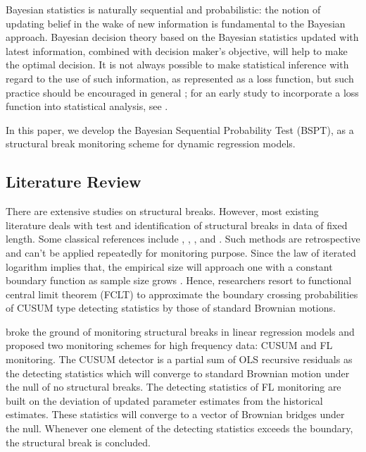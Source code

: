 \documentclass[preprint,authoryear,12pt,english]{elsarticle}
\theoremstyle{plain}
\begin{document}
Bayesian statistics is naturally sequential and probabilistic: the notion of updating belief in the wake of new information is fundamental to the Bayesian approach\citep{west1986bayesian}. Bayesian decision theory based on the Bayesian statistics updated with latest information, combined with decision maker's objective, will help to make the optimal decision. It is not always possible to make statistical inference with regard to the use of such information, as represented as a loss function, but such practice should be encouraged in general \citep[p.~1-2]{Berger1985StatisticalAnalysis}; for an early study to incorporate a loss function into statistical analysis, see \cite{Wald1949StatisticalFunctions}.

In this paper, we develop the Bayesian Sequential Probability Test (BSPT), as a structural break monitoring scheme for dynamic regression models.
\subsection{Literature Review}
There are extensive studies on structural breaks. However, most existing literature deals with test and identification of structural breaks in data of fixed length. Some classical references include \cite{Andrews1993}, \cite{Andrews1994OptimalAlternative}, \cite{Kuan1995TheView}, \cite{Bai1998a} and  \cite{Bai1994LEASTPROCESSES,Bai1995LeastShift,Bai1996TestingApproach, Bai1997EstimationModels}. Such methods are retrospective and can't be applied repeatedly for monitoring purpose. Since the law of iterated logarithm implies that, the empirical size will approach one with a constant boundary function as sample size grows \citep{Robbins1970StatisticalLogarithm}. Hence, researchers resort to functional central limit theorem (FCLT) to approximate the boundary crossing probabilities of CUSUM type detecting statistics by those of standard Brownian motions.

\cite{Chu1996} broke the ground of monitoring structural breaks in linear regression models and proposed two monitoring schemes for high frequency data: CUSUM and FL monitoring. The CUSUM detector is a partial sum of OLS recursive residuals as the detecting statistics which will converge to standard Brownian motion under the null of no structural breaks. The detecting statistics of FL monitoring are built on the deviation of updated parameter estimates from the historical estimates. These statistics will converge to a vector of Brownian bridges under the null. Whenever one element of the detecting statistics exceeds the boundary, the structural break is concluded.
\end{document}
